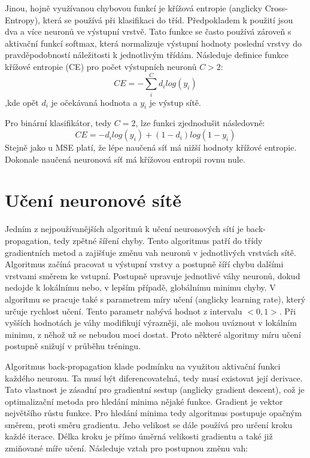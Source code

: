 Jinou, hojně využívanou chybovou funkcí je křížová entropie
(anglicky Cross-Entropy),
která se používá při klasifikaci do tříd.
Předpokladem k použití jsou dva a více neuronů ve výstupní vrstvě.
Tato funkce se často používá zároveň s aktivační funkcí softmax,
která normalizuje výstupní hodnoty poslední vrstvy 
do pravděpodobností náležitosti k jednotlivým třídám.
Následuje definice funkce křížové entropie (CE) pro počet výstupních neuronů $C > 2$:
\begin{equation}
    CE = - \sum^C_i d_i log(y_i)
\end{equation}
,kde opět $d_i$ je očekávaná hodnota a $y_i$ je výstup sítě.
\par

Pro binární klasifikátor, tedy $C = 2$, lze funkci zjednodušit následovně:
\begin{equation}
    CE = - d_i log(y_i) + (1 - d_i) log(1 - y_i)
\end{equation}
Stejně jako u MSE platí, že lépe naučená síť má nižší hodnoty křížové entropie.
Dokonale naučená neuronová síť má křížovou entropii rovnu nule.
\cite{Goodfellow-et-al-2016, Kvasnicka_NeuronoveSite, Mehrotra_ElementsOfNNs}

\section{Učení neuronové sítě}
Jedním z nejpoužívanějších algoritmů k učení neuronových sítí
je back-propagation, tedy zpětné šíření chyby.
Tento algoritmus patří do třídy gradientních metod
a zajišťuje změnu vah neuronů v jednotlivých vrstvách sítě.
Algoritmus začíná pracovat u výstupní vrstvy
a postupně šíří chybu dalšími vrstvami směrem ke vstupní.
Postupně upravuje jednotlivé váhy neuronů,
dokud nedojde k lokálnímu nebo, 
v lepším případě, globálnímu minimu chyby.
V algoritmu se pracuje také s parametrem míry učení (anglicky learning rate), který určuje rychlost učení.
Tento parametr nabývá hodnot z intervalu $<0,1>$.
Při vyšších hodnotách je váhy modifikují výrazněji,
ale mohou uváznout v lokálním minimu, z něhož už se nebudou moci dostat.
Proto některé algoritmy míru učení postupně snižují v průběhu tréningu.
\par

Algoritmus back-propagation klade podmínku na využitou aktivační funkci každého neuronu.
Ta musí být diferencovatelná, tedy musí existovat její derivace.
Tato vlastnost je zásadní pro gradientní sestup (anglicky gradient descent),
což je optimalizační metoda pro hledání minima nějaké funkce.
Gradient je vektor největšího růstu funkce.
Pro hledání minima tedy algoritmus postupuje opačným směrem,
proti směru gradientu.
Jeho velikost se dále používá pro určení kroku každé iterace.
Délka kroku je přímo úměrná velikosti gradientu 
a také již zmiňované míře učení.
Následuje vztah pro postupnou změnu vah:


